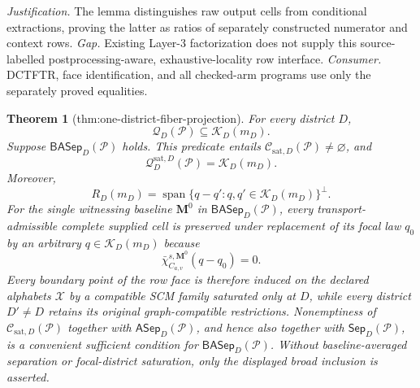 \documentclass{article}
\newtheorem{theorem}{Theorem}
\begin{document}
\par\smallskip\noindent \textit{Justification.} The lemma distinguishes raw output cells from conditional extractions, proving the latter as ratios of separately constructed numerator and context rows. \textit{Gap.} Existing Layer-3 factorization does not supply this source-labelled postprocessing-aware, exhaustive-locality row interface. \textit{Consumer.} DCTFTR, face identification, and all checked-arm programs use only the separately proved equalities.

\begin{theorem}[thm:one-district-fiber-projection]\label{thm:one-district-fiber-projection}
For every district \(D\),
\[
\mathcal Q_D(\mathcal P)\subseteq\mathcal K_D(m_D).
\]
Suppose \(\mathsf{BASep}_D(\mathcal P)\) holds.  This predicate entails \(\mathcal C_{\mathrm{sat},D}(\mathcal P)\ne\varnothing\), and
\[
\mathcal Q_D^{\mathrm{sat},D}(\mathcal P)=\mathcal K_D(m_D).
\]
Moreover,
\[
R_D(m_D)
=\operatorname{span}\{q-q':q,q'\in\mathcal K_D(m_D)\}^{\perp}.
\]
For the single witnessing baseline \(\mathbf M^0\) in \(\mathsf{BASep}_D(\mathcal P)\), every transport-admissible complete supplied cell is preserved under replacement of its focal law \(q_0\) by an arbitrary \(q\in\mathcal K_D(m_D)\) because
\[
\bar\chi_{C_{a,v}}^{s,\mathbf M^0}(q-q_0)=0.
\]
Every boundary point of the row face is therefore induced on the declared alphabets \(\mathcal X\) by a compatible SCM family saturated only at \(D\), while every district \(D'\ne D\) retains its original graph-compatible restrictions.  Nonemptiness of \(\mathcal C_{\mathrm{sat},D}(\mathcal P)\) together with \(\mathsf{ASep}_D(\mathcal P)\), and hence also together with \(\mathsf{Sep}_D(\mathcal P)\), is a convenient sufficient condition for \(\mathsf{BASep}_D(\mathcal P)\).  Without baseline-averaged separation or focal-district saturation, only the displayed broad inclusion is asserted.
\end{theorem}
\end{document}
